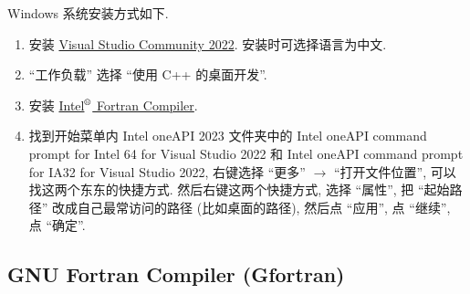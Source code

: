 Windows 系统安装方式如下.
\begin{enumerate}
    \item 安装 \href{https://visualstudio.microsoft.com/zh-hans/thank-you-downloading-visual-studio/?sku=Community&channel=Release&version=VS2022&source=VSLandingPage&cid=2030&passive=false}
    {Visual Studio Community 2022}. 安装时可选择语言为中文.
    \item ``工作负载'' 选择 ``使用 C++ 的桌面开发''.
    \item 安装 \href{https://registrationcenter-download.intel.com/akdlm/IRC_NAS/7feb5647-59dd-420d-8753-345d31e177dc/w_fortran-compiler_p_2024.2.0.424.exe}{Intel${}^\r$ Fortran Compiler}.
    \item 找到开始菜单内 Intel oneAPI 2023 文件夹中的 Intel oneAPI command prompt for Intel 64 for Visual Studio 2022 和 Intel oneAPI command prompt for IA32 for Visual Studio 2022, 右键选择 ``更多'' $\rightarrow$ ``打开文件位置'', 可以找这两个东东的快捷方式. 然后右键这两个快捷方式, 选择 ``属性'', 把 ``起始路径'' 改成自己最常访问的路径 (比如桌面的路径), 然后点 ``应用'', 点 ``继续'', 点 ``确定''.\label{to_desktop}
\end{enumerate}

\subsection[GNU Fortran\\Compiler]{GNU Fortran Compiler (Gfortran)}

